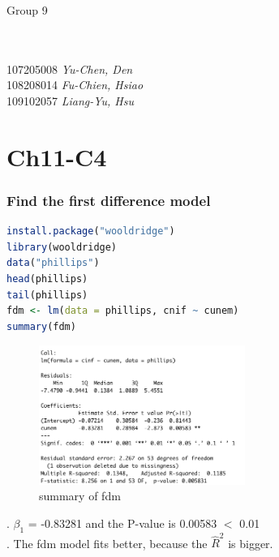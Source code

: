\documentclass[12pt]{article}
\begin{document}
 

\rhead{\today}

\begin{large}
    \hspace*{-5.8mm}Group 9
    \end{large}\\\\
    \hspace*{4mm} 107205008 \emph{Yu-Chen, Den}\\
    \hspace*{4mm} 108208014 \emph{Fu-Chien, Hsiao}\\
    \hspace*{4mm} 109102057 \emph{Liang-Yu, Hsu}

\section*{Ch11-C4}
\subsubsection*{Find the first difference model}
\begin{lstlisting}[language = R]
install.package("wooldridge")
library(wooldridge)
data("phillips")
head(phillips)
tail(phillips)
fdm <- lm(data = phillips, cnif ~ cunem)
summary(fdm)
\end{lstlisting}
\begin{figure}[H]
    \centering
    \includegraphics*[width = 0.6\textwidth]{fdm.png}
    \caption{summary of fdm}
\end{figure}
. $\beta_1$ = -0.83281 and the P-value is 0.00583 $<$ 0.01\\
. The fdm model fits better, because the $\hat R^2$ is bigger.
\newpage
\end{document}
